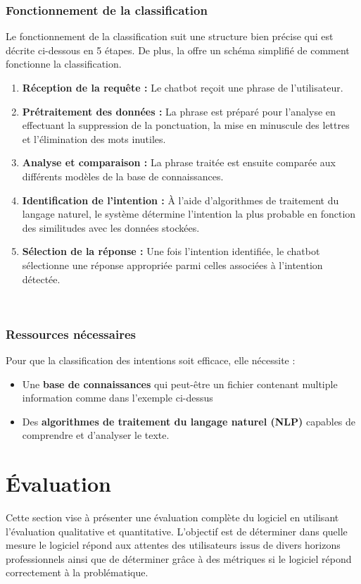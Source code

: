 \documentclass{rapport}
\begin{document}
\subsubsection{Fonctionnement de la classification}
Le fonctionnement de la classification suit une structure bien précise qui est décrite ci-dessous en 5 étapes. De plus, la  offre un schéma simplifié de comment fonctionne la classification.\
\begin{enumerate}
  \item \textbf{Réception de la requête :} Le chatbot reçoit une phrase de l'utilisateur.
  \item \textbf{Prétraitement des données :} La phrase est préparé pour l'analyse en effectuant la suppression de la ponctuation, la mise en minuscule des lettres et l'élimination des mots inutiles.
  \item \textbf{Analyse et comparaison :} La phrase traitée est ensuite comparée aux différents modèles de la base de connaissances.
  \item \textbf{Identification de l'intention :} À l'aide d'algorithmes de traitement du langage naturel, le système détermine l'intention la plus probable en fonction des similitudes avec les données stockées.
  \item \textbf{Sélection de la réponse :} Une fois l'intention identifiée, le chatbot sélectionne une réponse appropriée parmi celles associées à l'intention détectée.
\end{enumerate}
\\

\subsubsection{Ressources nécessaires}
Pour que la classification des intentions soit efficace, elle nécessite :
\begin{itemize}
  \item Une \textbf{base de connaissances} qui peut-être un fichier contenant multiple information comme dans l'exemple ci-dessus
  \item Des \textbf{algorithmes de traitement du langage naturel (NLP)} capables de comprendre et d'analyser le texte.
\end{itemize}

\newpage
\section{Évaluation}
Cette section vise à présenter une évaluation complète du logiciel en utilisant l'évaluation qualitative et quantitative. L'objectif est de déterminer dans quelle mesure le logiciel répond aux attentes des utilisateurs issus de divers horizons professionnels ainsi que de déterminer grâce à des métriques si le logiciel répond correctement à la problématique.
\end{document}
